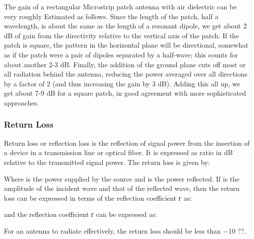 \documentclass[12pt]{article}
\begin{document}
	        The gain of a rectangular Microstrip patch antenna with air dielectric can be very roughly Estimated as follows. Since the length of the patch, half a wavelength, is about the same as the length of a resonant dipole, we get about 2 dB of gain from the directivity relative to the vertical axis of the patch. If the patch is square, the pattern in the horizontal plane will be directional, somewhat as if the patch were a pair of dipoles separated by a half-wave; this counts for about another 2-3 dB. Finally, the addition of the ground plane cuts off most or all radiation behind the antenna, reducing the power averaged over all directions by a factor of 2 (and thus increasing the gain by 3 dB). Adding this all up, we get about 7-9 dB for a square patch, in good agreement with more sophisticated approaches.

        \subsubsection{Return Loss}\label{Return Loss}
		 \justify
          Return loss or reflection loss is the reflection of signal power from the insertion of a device in a transmission line or optical fiber. It is expressed as ratio in dB relative to the transmitted signal power. The return loss is given by:


          Where is the power supplied by the source and is the power reflected.
          If is the amplitude of the incident wave and  that of the reflected wave, then the return loss can be expressed in terms of the reflection coefficient г as:
          
          and the reflection coefficient г can be expressed as:

          For an antenna to radiate effectively, the return loss should be less than −10 ??.
\end{document}
